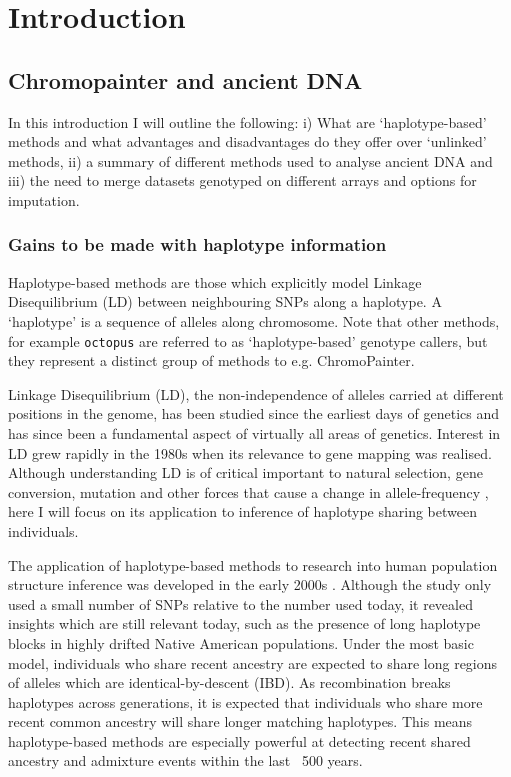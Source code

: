 \chapter{Introduction}

\section{Chromopainter and ancient DNA}

In this introduction I will outline the following: i) What are `haplotype-based' methods and what advantages and disadvantages do they offer over `unlinked' methods, ii) a summary of different methods used to analyse ancient DNA and iii) the need to merge datasets genotyped on different arrays and options for imputation. 

\subsection{Gains to be made with haplotype information}

Haplotype-based methods are those which explicitly model Linkage Disequilibrium (LD) between neighbouring SNPs along a haplotype. A `haplotype' is a sequence of alleles along chromosome. Note that other methods, for example \texttt{octopus} \cite{octopus} are referred to as `haplotype-based' genotype callers, but they represent a distinct group of methods to e.g. ChromoPainter.  

Linkage Disequilibrium (LD), the non-independence of alleles carried at different positions in the genome, has been studied since the earliest days of genetics \cite{morgan1912complete, bateson1902experiments} and has since been a fundamental aspect of virtually all areas of genetics. Interest in LD grew rapidly in the 1980s when its relevance to gene mapping was realised. Although understanding LD is of critical important to natural selection, gene conversion, mutation and other forces that cause a change in allele-frequency \cite{slatkin2008linkage}, here I will focus on its application to inference of haplotype sharing between individuals. 

The application of haplotype-based methods to research into human population structure inference was developed in the early 2000s \cite{conrad2006worldwide}. Although the study only used a small number of SNPs relative to the number used today, it revealed insights which are still relevant today, such as the presence of long haplotype blocks in highly drifted Native American populations. Under the most basic model, individuals who share recent ancestry are expected to share long regions of alleles which are identical-by-descent (IBD). As recombination breaks haplotypes across generations, it is expected that individuals who share more recent common ancestry will share longer matching haplotypes. This means haplotype-based methods are especially powerful at detecting recent shared ancestry and admixture events within the last ~500 years.
 
